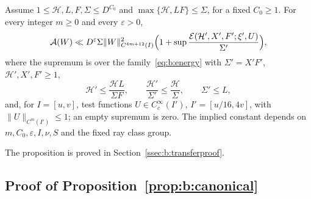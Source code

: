 \begin{proposition}\label{prop:b:transfer}
Assume $1\le\mathcal H,L,F,\Sigma\le D^{C_0}$ and $\max\{\mathcal H,LF\}\le\Sigma$, for a fixed $C_0\ge1$. For every integer $m\ge0$ and every $\varepsilon>0$,
\begin{equation}\label{eq:b:transfersummary}
  \mathcal A(W)\ll D^\varepsilon\Sigma\|W\|^2_{C^{4m+12}(I)}\Bigl(1+\sup\frac{\mathcal{E}(\mathcal H',X',F';\xi',U)}{\Sigma'}\Bigr),
\end{equation}
where the supremum is over the family~\eqref{eq:b:energy} with $\Sigma'=X'F'$, $\mathcal H',X',F'\ge1$,
\begin{equation}\label{eq:b:transferscales}
  \mathcal H'\le\frac{\mathcal HL}{\Sigma F},\qquad\frac{\mathcal H'}{\Sigma'}\le\frac{\mathcal H}\Sigma,\qquad\Sigma'\le L,
\end{equation}
and, for $I=[u,v]$, test functions $U\in C_c^\infty(I')$, $I'=[u/16,4v]$, with $\|U\|_{C^m(I')}\le1$; an empty supremum is zero. The implied constant depends on $m,C_0,\varepsilon,I,\nu,S$ and the fixed ray class group.
\end{proposition}

The proposition is proved in Section~\ref{ssec:b:transferproof}.

\subsection{Proof of Proposition~\ref{prop:b:canonical}}\label{ssec:b:canonicalproof}

